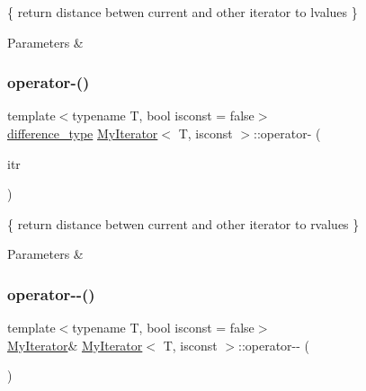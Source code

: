 \{ return distance betwen current and other iterator to lvalues \} 


\begin{DoxyParams}{Parameters}
{\em } & \\
\hline
\end{DoxyParams}
\mbox{\label{classMyIterator_acd9e090badecfce5e154b55a581b9bae}} 
\subsubsection{\texorpdfstring{operator-\/()}{operator-()}\hspace{0.1cm}{\footnotesize\ttfamily [2/2]}}
{\footnotesize\ttfamily template$<$typename T, bool isconst = false$>$ \\
\hyperlink{classMyIterator_ad6844a285132dae3746eab56209a19df}{difference\+\_\+type} \hyperlink{classMyIterator}{My\+Iterator}$<$ T, isconst $>$\+::operator-\/ (\begin{DoxyParamCaption}\item[{\hyperlink{classMyIterator}{My\+Iterator}$<$ T, isconst $>$ \&\&}]{itr }\end{DoxyParamCaption})\hspace{0.3cm}{\ttfamily [inline]}}



\{ return distance betwen current and other iterator to rvalues \} 


\begin{DoxyParams}{Parameters}
{\em } & \\
\hline
\end{DoxyParams}
\mbox{\label{classMyIterator_ae4acfd6eb2cf90596b33b1874dd3cf5f}} 
\subsubsection{\texorpdfstring{operator-\/-\/()}{operator--()}\hspace{0.1cm}{\footnotesize\ttfamily [1/2]}}
{\footnotesize\ttfamily template$<$typename T, bool isconst = false$>$ \\
\hyperlink{classMyIterator}{My\+Iterator}\& \hyperlink{classMyIterator}{My\+Iterator}$<$ T, isconst $>$\+::operator-\/-\/ (\begin{DoxyParamCaption}\item[{void}]{ }\end{DoxyParamCaption})\hspace{0.3cm}{\ttfamily [inline]}}



